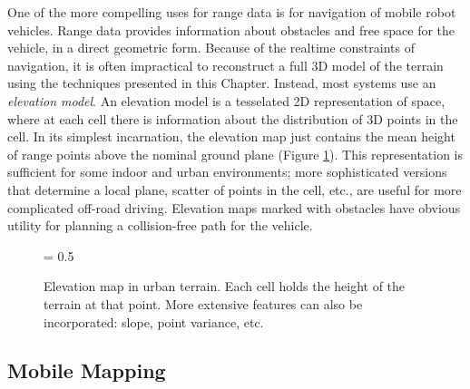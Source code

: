 \documentclass[twocolumn,oneside]{book}
\begin{document}
One of the more compelling uses for range data is for navigation of
mobile robot vehicles.  Range data provides information about
obstacles and free space for the vehicle, in a direct geometric form.
Because of the realtime constraints of navigation, it is often
impractical to reconstruct a full 3D model of the terrain using the
techniques presented in this Chapter.  Instead, most systems use an
{\em elevation model}.  An elevation model is a tesselated 2D
representation of space, where at each cell there is information about
the distribution of 3D points in the cell.  In its simplest
incarnation, the elevation map just contains the mean height of range
points above the nominal ground plane (Figure
\ref{elevation_map.ch31}).  This representation is sufficient for some
indoor and urban environments; more sophisticated versions that
determine a local plane, scatter of points in the cell, etc., are
useful for more complicated off-road driving.  Elevation maps marked
with obstacles have obvious utility for planning a collision-free path
for the vehicle.

\begin{figure}[hbt]
{\epsfxsize = 0.5\textwidth {}}
\caption{Elevation map in urban terrain.  Each cell holds the height
of the terrain at that point.  More extensive features can also be
incorporated: slope, point variance, etc.
\label{elevation_map.ch31}}
\end{figure}

\subsection{Mobile Mapping}
\end{document}
